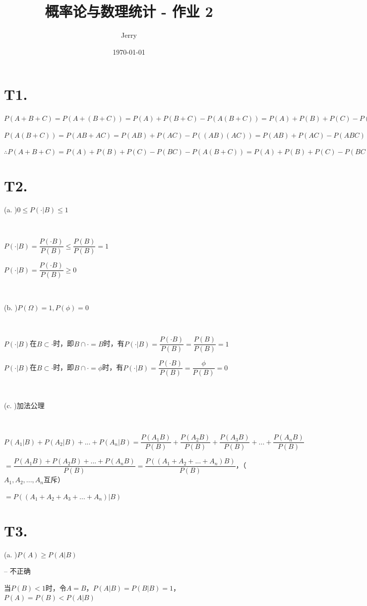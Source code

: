 \documentclass{article}
\title{\bf\huge 概率论与数理统计 - 作业 2}
\author{Jerry}
\date{\today}
\begin{document}
\maketitle

\section*{T1. }

$P(A+B+C)=P(A+(B+C))=P(A)+P(B+C)-P(A(B+C))=P(A)+P(B)+P(C)-P(BC)-P(A(B+C))$

$P(A(B+C))=P(AB+AC)=P(AB)+P(AC)-P((AB)(AC))=P(AB)+P(AC)-P(ABC)$

$\therefore P(A+B+C)=P(A)+P(B)+P(C)-P(BC)-P(A(B+C))=P(A)+P(B)+P(C)-P(BC)-P(AB)-P(AC)+P(ABC)$

\section*{T2. }

(a. )$0 \leq P(·|B) \leq 1$

~

$P(·|B)=\dfrac{P(·B)}{P(B)}\leq \dfrac{P(B)}{P(B)}=1$

$P(·|B)=\dfrac{P(·B)}{P(B)}\geq 0$

~

(b. )$P(\Omega)=1,P(\phi)=0$

~

$P(·|B)$在$B\subset ·$时，即$B \cap · =B$时，有$P(·|B)=\dfrac{P(·B)}{P(B)}=\dfrac{P(B)}{P(B)}=1$

$P(·|B)$在$B\subset ·$时，即$B \cap · =\phi$时，有$P(·|B)=\dfrac{P(·B)}{P(B)}=\dfrac{\phi}{P(B)}=0$

~

(c. )加法公理

~

$P(A_1|B)+P(A_2|B)+...+P(A_n|B)=\dfrac{P(A_1B)}{P(B)}+\dfrac{P(A_2B)}{P(B)}+\dfrac{P(A_3B)}{P(B)}+...+\dfrac{P(A_nB)}{P(B)}$

$=\dfrac{P(A_1B)+P(A_2B)+...+P(A_nB)}{P(B)}=\dfrac{P((A_1+A_2+...+A_n)B)}{P(B)}$，（$A_1,A_2,...,A_n$互斥）

$=P((A_1+A_2+A_3+...+A_n)|B)$

\section*{T3. }

(a. )$P(A) \geq P(A|B)$

-- 不正确

当$P(B)<1$时，令$A=B$，$P(A|B)=P(B|B)=1$，$P(A)=P(B)<P(A|B)$
\end{document}
